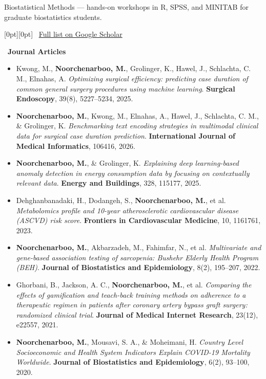 \documentclass[10pt,a4paper,ragged2e]{altacv}
\begin{document}

\vspace{-2mm}
{\small Biostatistical Methods --- hands-on workshops in R, SPSS, and MINITAB for graduate biostatistics students.}

\vspace{1mm}

\hfill
{\raisebox{0.25ex}[0pt][0pt]{%
\colorbox{blue!10}{%
\small\textcolor{blue}{\faGraduationCap\ \href{https://scholar.google.ca/citations?user=nn_Toq0AAAAJ&hl=en}{Full list on Google Scholar}}%
}}}
\vspace{-0.7em}

\textcolor{VividPurple}{\faBook\ \textbf{Journal Articles}}
\begin{itemize}
\item Kwong, M., \textbf{Noorchenarboo, M.}, Grolinger, K., Hawel, J., Schlachta, C. M., Elnahas, A. \textit{Optimizing surgical efficiency: predicting case duration of common general surgery procedures using machine learning}. \textbf{Surgical Endoscopy}, 39(8), 5227--5234, 2025.

\item \textbf{Noorchenarboo, M.}, Kwong, M., Elnahas, A., Hawel, J., Schlachta, C. M., \& Grolinger, K. \textit{Benchmarking text encoding strategies in multimodal clinical data for surgical case duration prediction}. \textbf{International Journal of Medical Informatics}, 106416, 2026.

\item \textbf{Noorchenarboo, M.}, \& Grolinger, K. \textit{Explaining deep learning-based anomaly detection in energy consumption data by focusing on contextually relevant data}. \textbf{Energy and Buildings}, 328, 115177, 2025.

\item Dehghanbanadaki, H., Dodangeh, S., \textbf{Noorchenarboo, M.}, et al. \textit{Metabolomics profile and 10-year atherosclerotic cardiovascular disease (ASCVD) risk score}. \textbf{Frontiers in Cardiovascular Medicine}, 10, 1161761, 2023.

\item \textbf{Noorchenarboo, M.}, Akbarzadeh, M., Fahimfar, N., et al. \textit{Multivariate and gene-based association testing of sarcopenia: Bushehr Elderly Health Program (BEH)}. \textbf{Journal of Biostatistics and Epidemiology}, 8(2), 195--207, 2022.

\item Ghorbani, B., Jackson, A. C., \textbf{Noorchenarboo, M.}, et al. \textit{Comparing the effects of gamification and teach-back training methods on adherence to a therapeutic regimen in patients after coronary artery bypass graft surgery: randomized clinical trial}. \textbf{Journal of Medical Internet Research}, 23(12), e22557, 2021.

\item \textbf{Noorchenarboo, M.}, Mousavi, S. A., \& Moheimani, H. \textit{Country Level Socioeconomic and Health System Indicators Explain COVID-19 Mortality Worldwide}. \textbf{Journal of Biostatistics and Epidemiology}, 6(2), 93--100, 2020.
\end{itemize}
\end{document}
